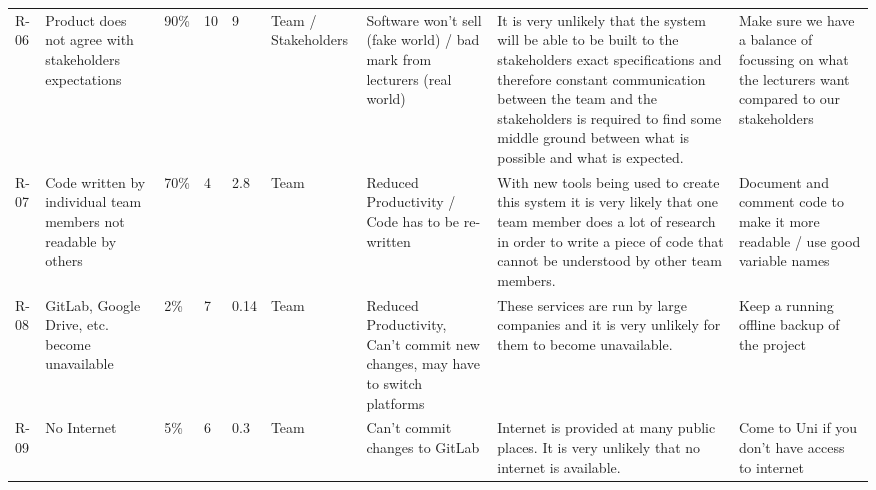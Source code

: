 \begin{tabular}{lllllllll}
R-06 & Product does not agree with stakeholders expectations                      & 90\%                                                           & 10                                                       & 9                                                            & Team / Stakeholders & Software won’t sell (fake world) / bad mark from lecturers (real world)                      & It is very unlikely that the system will be able to be built to the stakeholders exact specifications and therefore constant communication between the team and the stakeholders is required to find some middle ground between what is possible and what is expected. & Make sure we have a balance of focussing on what the lecturers want compared to our stakeholders \\
R-07 & Code written by individual team members not readable by others             & 70\%                                                           & 4                                                        & 2.8                                                          & Team                & Reduced Productivity / Code has to be re-written                                             & With new tools being used to create this system it is very likely that one team member does a lot of research in order to write a piece of code that cannot be understood by other team members.                                                                       & Document and comment code to make it more readable / use good variable names                     \\
R-08 & GitLab, Google Drive, etc. become unavailable                              & 2\%                                                            & 7                                                        & 0.14                                                         & Team                & Reduced Productivity, Can’t commit new changes, may have to switch platforms                 & These services are run by large companies and it is very unlikely for them to become unavailable.                                                                                                                                                                      & Keep a running offline backup of the project                                                     \\
R-09 & No Internet                                                                & 5\%                                                            & 6                                                        & 0.3                                                          & Team                & Can’t commit changes to GitLab                                                               & Internet is provided at many public places. It is very unlikely that no internet is available.                                                                                                                                                                         & Come to Uni if you don’t have access to internet                                                 \\

\end{tabular}
